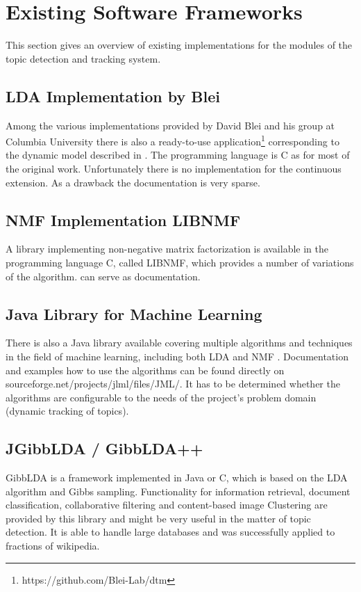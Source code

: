 \section{Existing Software Frameworks}\label{sec:software}

This section gives an overview of existing implementations for the modules of the topic detection and tracking system.

\subsection{LDA Implementation by Blei}

Among the various implementations provided by David Blei and his group at Columbia University there is also a ready-to-use application\footnote{https://github.com/Blei-Lab/dtm} corresponding to the dynamic model described in \cite{Blei:2006:DTM:1143844.1143859}. The programming language is C as for most of the original work. Unfortunately there is no implementation for the continuous extension. As a drawback the documentation is very sparse.

\subsection{NMF Implementation LIBNMF}

A library implementing non-negative matrix factorization is available in the programming language C, called LIBNMF, which provides a number of variations of the algorithm. \cite{NMFSoftware} can serve as documentation.

\subsection{Java Library for Machine Learning}

There is also a Java library available covering multiple algorithms and techniques in the field of machine learning, including both LDA and NMF \cite{MLSoftware}. Documentation and examples how to use the algorithms can be found directly on sourceforge.net/projects/jlml/files/JML/. It has to be determined whether the algorithms are configurable to the needs of the project's problem domain (dynamic tracking of topics).

\subsection{JGibbLDA / GibbLDA++}
GibbLDA is a framework implemented in Java or C, which is based on the LDA algorithm and Gibbs sampling. Functionality for information retrieval, document classification, collaborative filtering and content-based image Clustering are provided by this library and might be very useful in the matter of topic detection. It is able to handle large databases and was successfully applied to fractions of wikipedia. 